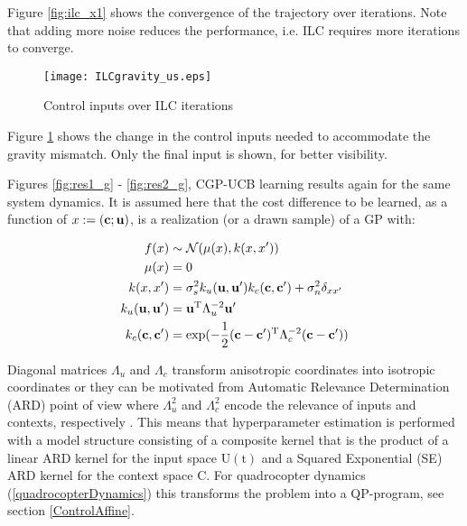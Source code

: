 Figure \ref{fig:ilc_x1} shows the convergence of the trajectory over iterations. Note that adding more noise reduces the performance, i.e. ILC requires more iterations to converge.

\begin{figure}
\center
\texttt{[image: ILCgravity\_us.eps]}	
\caption{Control inputs over ILC iterations}
\label{fig:ilc_u1}
\end{figure}

Figure \ref{fig:ilc_u1} shows the change in the control inputs needed to accommodate the gravity mismatch. Only the final input is shown, for better visibility.

Figures \ref{fig:res1_g} - \ref{fig:res2_g}, CGP-UCB learning results again for the same system dynamics. It is assumed here that the cost difference to be learned, as a function of $x := (\mathbf{c};\mathbf{u})$, is a realization (or a drawn sample) of a GP with:

\begin{align}
f(x) &\sim \mathcal{N}(\mu(x), k(x, x')) \label{GP prior for quadrocopter} \\
\mu(x) &= 0 %
\label{mean hyperparameters for quadrocopter} \\
k(x, x') &= \sigma_{s}^{2}k_u(\sysInput, \sysInput')k_c(\context, \context') + \sigma_{n}^{2}\delta_{xx'} \label{kernel} \\ 
k_u(\sysInput, \sysInput') &= \sysInput^{\mathrm{T}}\Lambda_{u}^{-2}\sysInput' \label{action kernel} \\
k_c(\context, \context') &= \exp(-\frac{1}{2}(\context-\context')^{\mathrm{T}}\Lambda_{c}^{-2}(\context-\context')) \label{context kernel}
\end{align}

Diagonal matrices $\Lambda_{u}$ and $\Lambda_{c}$ transform anisotropic coordinates into isotropic coordinates or they can be motivated from Automatic Relevance Determination (ARD) point of view where $\Lambda_{u}^{2}$ and $\Lambda_{c}^{2}$ encode the relevance of inputs and contexts, respectively \cite{GPbook}.
This means that hyperparameter estimation is performed with a model structure consisting of 
a composite kernel that is the product of a linear ARD kernel for the input space $\mathrm{U(t)}$ and a Squared Exponential (SE) ARD kernel for the context space $\mathrm{C}$. For quadrocopter dynamics (\ref{quadrocopterDynamics}) this transforms the problem into a QP-program, see section \ref{ControlAffine}.

